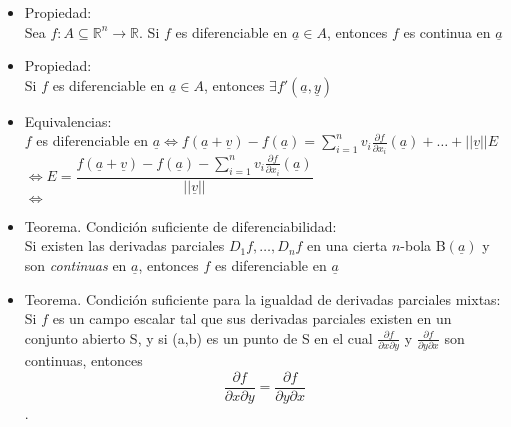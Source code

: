 \documentclass[a4paper, 12pt]{article}
\begin{document}
\begin{itemize}
\item Propiedad: \\
Sea $f:A\subseteq \mathbb{R}^n \to \mathbb{R}$. Si $f$ es diferenciable en $\underline{a} \in A$, entonces $f$ es continua en $\underline{a}$
\item Propiedad: \\
Si $f$ es diferenciable en $\underline{a} \in A$, entonces $\exists f'(\underline{a},\underline{y})$

\item Equivalencias: \\
$f$ es diferenciable en $\displaystyle \underline{a} \Longleftrightarrow f(\underline{a}+\underline{v})-f(\underline{a})=\sum_{i=1}^n v_i \frac{\partial f}{\partial x_i}(\underline{a}) + \dots +||\underline{v}||E$ \\
$\Longleftrightarrow E = \dfrac{f(\underline{a} + \underline{v})-f(\underline{a})-\displaystyle \sum_{i=1}^n v_i \frac{\partial f}{\partial x_i}(\underline{a})}{||\underline{v}||}$ \\
$\Longleftrightarrow$

\item Teorema. Condición suficiente de diferenciabilidad: \\
Si existen las derivadas parciales $D_1f, \dots, D_nf$ en una cierta $n$-bola B$(\underline{a})$ y son \emph{continuas} en $\underline{a}$, entonces $f$ es diferenciable en $\underline{a}$

\item Teorema. Condición suficiente para la igualdad de derivadas parciales mixtas: \\
Si $f$ es un campo escalar tal que sus derivadas parciales existen en un conjunto abierto S, y si (a,b) es un punto de S en el cual $\frac{\partial f}{\partial x \partial y}$ y $\frac{\partial f}{\partial y \partial x}$ son continuas, entonces $$\displaystyle \frac{\partial f}{\partial x \partial y} = \frac{\partial f}{\partial y \partial x}$$.






\newpage




\end{itemize}
\end{document}
